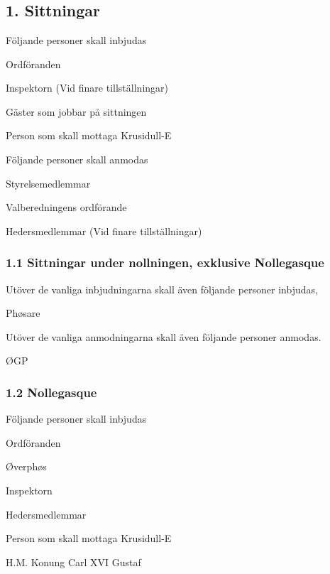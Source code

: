 \documentclass[10pt]{article}
\begin{document}
\section*{\doctitle}

\subsection*{1. Sittningar}
Följande personer skall inbjudas
\begin{dashlist}
    \item Ordföranden
    \item Inspektorn (Vid finare tillställningar) 
    \item Gäster som jobbar på sittningen 
    \item Person som skall mottaga Krusidull-E
    
\end{dashlist}
Följande personer skall anmodas
\begin{dashlist}
    \item Styrelsemedlemmar
    \item Valberedningens ordförande
    \item Hedersmedlemmar (Vid finare tillställningar) 
\end{dashlist}

\subsubsection*{1.1 Sittningar under nollningen, exklusive Nollegasque}
Utöver de vanliga inbjudningarna skall även följande personer inbjudas, 
\begin{dashlist}
    \item Phøsare
\end{dashlist}
Utöver de vanliga anmodningarna skall även följande personer anmodas. 
\begin{dashlist}
    \item ØGP
\end{dashlist}

\subsubsection*{1.2 Nollegasque}
Följande personer skall inbjudas
    \begin{dashlist}
        \item Ordföranden
        \item Øverphøs
        \item Inspektorn
        \item Hedersmedlemmar
        \item Person som skall mottaga Krusidull-E
        \item H.M. Konung Carl XVI Gustaf
    \end{dashlist}
\end{document}
